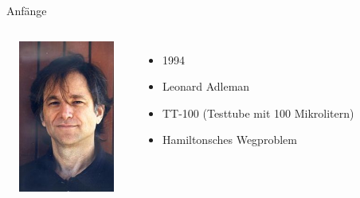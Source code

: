 \documentclass{beamer}
\begin{document}
\begin{frame}{Anfänge}
		\begin{columns}
		\centering
		\includegraphics[height=5cm, width=4cm]{./12.jpg}%
		
		\begin{itemize}
	\item  1994 
	\pause \item  Leonard Adleman 
	\pause \item TT-100 (Testtube mit 100 Mikrolitern) 
	\pause \item Hamiltonsches Wegproblem  
		\end{itemize}
	\end{columns}
\end{frame}
\end{document}
